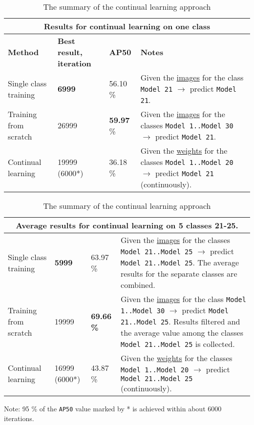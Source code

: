 \begin{table}
\centering
\caption{The summary of the continual learning approach}\label{summary_table_2} 
\begin{tabularx}{\textwidth}{|p{1.5cm}|p{1.5cm}|p{1.5cm}|X|} 
 \hline
\multicolumn{4}{c}{\textbf{Results for continual learning on one class}} \\ \hline
\textbf{Method} & \textbf{Best result, iteration} & \textbf{AP50} & \textbf{Notes} \\
\hline
Single class training & \textbf{6999} & 56.10 \% & \multicolumn{1}{m{9cm}|}{Given the \uline{images} for the class \texttt{Model 21} $\rightarrow$ predict \texttt{Model 21}.} \\ 
\hline
Training from scratch  & 26999 & \textbf{59.97} \% & \multicolumn{1}{m{9cm}|}{Given the \uline{images} for the classes \texttt{Model 1..Model 30} $\rightarrow$ predict \texttt{Model 21}.} \\ 
\hline
Continual learning & 19999 (6000*) & 36.18 \% & \multicolumn{1}{m{9cm}|}{Given the \uline{weights} for the classes  \texttt{Model 1..Model 20} $\rightarrow$ predict \texttt{Model 21} (continuously).} \\ 
\hline  
\end{tabularx} 
\begin{tabularx}{\textwidth}{|p{1.5cm}|p{1.5cm}|p{1.5cm}|X|} 
\multicolumn{4}{c}{\textbf{Average results for continual learning on 5 classes 21-25}.} \\ 
\hline
Single class training  & \textbf{5999} & 63.97 \% & \multicolumn{1}{m{9cm}|}{Given the \uline{images} for the classes \texttt{Model 21..Model 25} $\rightarrow$ predict \texttt{Model 21..Model 25}. The average results for the  separate classes are combined.} \\ 
\hline
Training from scratch & 19999 & \textbf{69.66 \%} & \multicolumn{1}{m{9cm}|}{Given the \uline{images} for the class \texttt{Model 1..Model 30} $\rightarrow$ predict \texttt{Model 21..Model 25}. Results filtered and the average value among the classes \texttt{Model 21..Model 25} is collected.} \\ 
\hline
Continual learning & 16999 (6000*) & 43.87 \% & \multicolumn{1}{m{9cm}|}{Given the \uline{weights} for the classes \texttt{Model 1..Model 20} $\rightarrow$ predict \texttt{Model 21..Model 25} (continuously). } \\ 
\hline      
\end{tabularx}
\begin{tablenotes}
\small
\item Note: 95 \% of the \texttt{AP50} value marked by * is achieved within about 6000 iterations.
\end{tablenotes}
\end{table}
\FloatBarrier 

